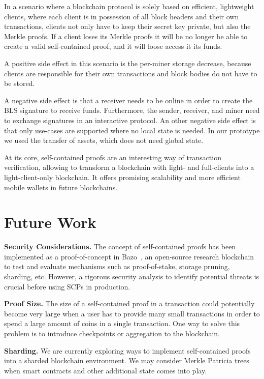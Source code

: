 \documentclass[conference]{IEEEtran}
\begin{document}
In a scenario where a blockchain protocol is solely based on efficient, lightweight clients, where each client is in possession of all block headers and their own transactions, clients not only have to keep their secret key private, but also the Merkle proofs. If a client loses its Merkle proofs it will be no longer be able to create a valid self-contained proof, and it will loose access it its funds.

A positive side effect in this scenario is the per-miner storage decrease, because clients are responsible for their own transactions and block bodies do not have to be stored.

A negative side effect is that a receiver needs to be online in order to create the BLS signature to receive funds. Furthermore, the sender, receiver, and miner need to exchange signatures in an interactive protocol. An other negative side effect is that only use-cases are supported where no local state is needed. In our prototype we used the transfer of assets, which does not need global state. 

At its core, self-contained proofs are an interesting way of transaction verification, allowing to transform a blockchain with light- and full-clients into a light-client-only blockchain. It offers promising scalability and more efficient mobile wallets in future blockchains.

\section{Future Work}

\textbf{Security Considerations.} The concept of self-contained proofs has been implemented as a proof-of-concept in Bazo~\cite{Bazo}, an open-source research blockchain to test and evaluate mechanisms such as proof-of-stake, storage pruning, sharding, etc. However, a rigorous security analysis to identify potential threats is crucial before using SCPs in production.

\textbf{Proof Size.} The size of a self-contained proof in a transaction could potentially become very large when a user has to provide many small transactions in order to spend a large amount of coins in a single transaction. One way to solve this problem is to introduce checkpoints or aggregation to the blockchain.

\textbf{Sharding.} We are currently exploring ways to implement self-contained proofs into a sharded blockchain environment. We may consider Merkle Patricia trees \cite{MerklePatriciaTree} when smart contracts and other additional state comes into play.
\end{document}

